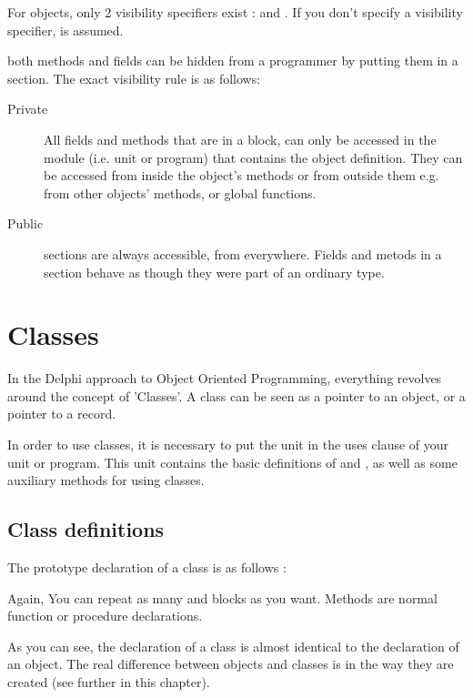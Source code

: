 \documentclass{report}
\begin{document}
For objects, only 2 visibility specifiers exist :  and 
. If you don't specify a visibility specifier,  
is assumed.

both methods and fields can be hidden from a programmer by putting them
in a  section. The exact visibility rule is as follows:

\begin{description}
\item [Private\ ] All fields and methods that are in a  block, 
can  only be accessed in the module (i.e. unit or program) that contains 
the object definition.
They can be accessed from inside the object's methods or from outside them
e.g. from other objects' methods, or global functions.
\item [Public\ ] sections are always accessible, from everywhere.
Fields and metods in a  section behave as though they were part
of an ordinary  type.
\end{description}

\chapter{Classes}

In the Delphi approach to Object Oriented Programming, everything revolves
around  the concept of 'Classes'.  A class can be seen as a pointer to an 
object, or a pointer to a record. 

In order to use classes, it is necessary to put the  unit in the
uses clause of your unit or program. This unit contains the basic
definitions of  and , as well as some auxiliary
methods for using classes.

\section{Class definitions}
The prototype declaration of a class is as follows :



Again, You can repeat as many  and  blocks as you 
want. Methods are normal function or procedure declarations. 

As you can see, the declaration of a class is almost identical to the
declaration of an object. The real difference between objects and classes
is in the way they are created (see further in this chapter).
\end{document}
